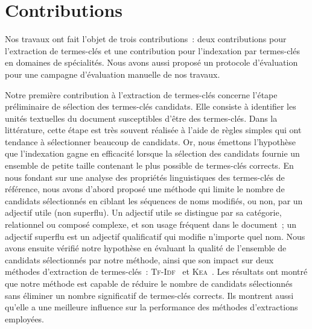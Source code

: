   \section{Contributions}
  \label{sec:main-conclusion-contributions}
    Nos travaux ont fait l'objet de trois contributions~: deux contributions
    pour l'extraction de termes-clés et une contribution pour l'indexation par
    termes-clés en domaines de spécialités. Nous avons aussi proposé un
    protocole d'évaluation pour une campagne d'évaluation manuelle de nos
    travaux.

    Notre première contribution à l'extraction de termes-clés concerne l'étape
    préliminaire de sélection des termes-clés candidats. Elle consiste à
    identifier les unités textuelles du document susceptibles d'être des
    termes-clés. Dans la littérature, cette étape est très souvent réalisée à
    l'aide de règles simples qui ont tendance à sélectionner beaucoup de
    candidats. Or, nous émettons l'hypothèse que l'indexation gagne en
    efficacité lorsque la sélection des candidats fournie un ensemble de petite
    taille contenant le plus possible de termes-clés corrects.
    En nous fondant sur une analyse des propriétés linguistiques des termes-clés
    de référence, nous avons d'abord proposé une méthode qui limite le nombre de
    candidats sélectionnés en ciblant les séquences de noms modifiés, ou non,
    par un adjectif utile (non superflu). Un adjectif utile se distingue par sa
    catégorie, relationnel ou composé complexe, et son usage fréquent dans le
    document~; un adjectif superflu est un adjectif qualificatif qui modifie
    n'importe quel nom.
    Nous avons ensuite vérifié notre hypothèse en évaluant la qualité de
    l'ensemble de candidats sélectionnés par notre méthode, ainsi que son impact
    sur deux méthodes d'extraction de termes-clés~:
    \textsc{Tf-Idf}~\cite{salton1975tfidf} et \textsc{Kea}~\cite{witten1999kea}.
    Les résultats ont montré que notre méthode est capable de réduire le nombre
    de candidats sélectionnés sans éliminer un nombre significatif de
    termes-clés corrects. Ils montrent aussi qu'elle a une meilleure influence
    sur la performance des méthodes d'extractions employées.

